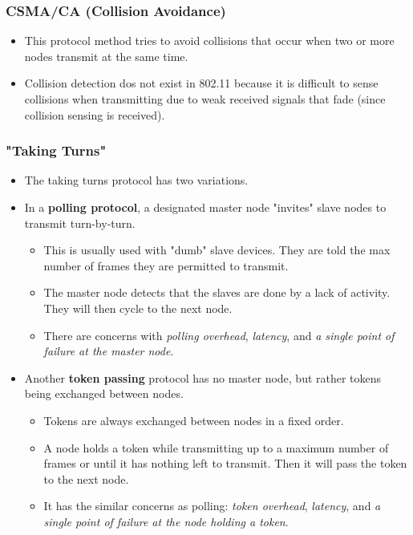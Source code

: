 \documentclass{article}
\begin{document}
\clearpage

\subsubsection{CSMA/CA (Collision Avoidance)}
\begin{itemize}
\item This protocol method tries to avoid collisions that occur when two or more nodes transmit at the same time.
\item Collision detection dos not exist in 802.11 because it is difficult to sense collisions when transmitting due to weak received signals that fade (since collision sensing is received).
\end{itemize}

\subsubsection{"Taking Turns"}
\begin{itemize}
\item The taking turns protocol has two variations.
\item In a {\bf polling protocol}, a designated master node "invites" slave nodes to transmit turn-by-turn.
\begin{itemize}
\item This is usually used with "dumb" slave devices. They are told the max number of frames they are permitted to transmit.
\item The master node detects that the slaves are done by a lack of activity. They will then cycle to the next node.
\item There are concerns with \emph{polling overhead}, \emph{latency}, and \emph{a single point of failure at the master node}.
\end{itemize}
\item Another {\bf token passing} protocol has no master node, but rather tokens being exchanged between nodes.
\begin{itemize}
\item Tokens are always exchanged between nodes in a fixed order.
\item A node holds a token while transmitting up to a maximum number of frames or until it has nothing left to transmit. Then it will pass the token to the next node.
\item It has the similar concerns as polling: \emph{token overhead}, \emph{latency}, and \emph{a single point of failure at the node holding a token}.
\end{itemize}
\end{itemize}
\end{document}
